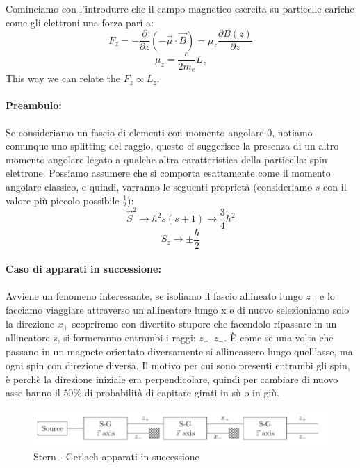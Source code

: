 \noindent Cominciamo con l'introdurre che il campo magnetico esercita su particelle cariche come gli elettroni una forza pari a:
$$F_z = -\frac{\partial}{\partial z}\left(-\vec{\mu}\cdot\vec{B}\right) = \mu_z\frac{\partial B(z)}{\partial z}$$
$$\mu_z = \frac{e}{2m_e}L_z$$
This way we can relate the $F_z \propto L_z$.

\paragraph{Preambulo:}
Se consideriamo un fascio di elementi con momento angolare 0, notiamo comunque uno splitting del raggio, questo ci suggerisce la presenza di un altro momento angolare legato a qualche altra caratteristica della particella: spin elettrone. Possiamo assumere che si comporta esattamente come il momento angolare classico, e quindi, varranno le seguenti proprietà (consideriamo $s$ con il valore più piccolo possibile $\frac{1}{2}$):
$$\vec{S}^2 \rightarrow \hbar^2s(s+1) \rightarrow \frac{3}{4}\hbar^2$$
$$S_z \rightarrow \pm \frac{\hbar}{2}$$

\paragraph{Caso di apparati in successione:}

Avviene un fenomeno interessante, se isoliamo il fascio allineato lungo $z_+$ e lo facciamo viaggiare attraverso un allineatore lungo x e di nuovo selezioniamo solo la direzione $x_+$ scopriremo con divertito stupore che facendolo ripassare in un allineatore z, si formeranno entrambi i raggi: $z_+, z_-$.
È come se una volta che passano in un magnete orientato diversamente si allineassero lungo quell'asse, ma ogni spin con direzione diversa. Il motivo per cui sono presenti entrambi gli spin, è perchè la direzione iniziale era perpendicolare, quindi per cambiare di nuovo asse hanno il $50\%$ di probabilità di capitare girati in sù o in giù.

\begin{figure}[ht]
	\centering
	\includegraphics[width=1\textwidth]{../images/Screenshot 2025-02-19 125717.png} 
	\caption{Stern - Gerlach apparati in successione}
	\label{fig:stern}
\end{figure}

